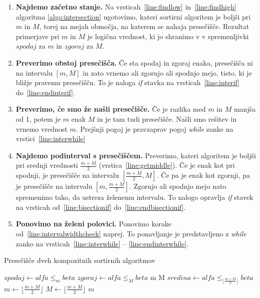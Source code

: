 \documentclass[a4paper,oneside,12pt]{article}
\def\False{\texttt{false}}
\def\True{\texttt{true}}
\begin{document}
\begin{enumerate}
  \item \textbf{Najdemo začetno stanje.} Na vrsticah~\ref{line:findlow} in~\ref{line:findhigh} algoritma
   \ref{algo:intersection} ugotovimo, kateri sortirni
    algoritem je boljši pri $m$ in $M$, torej na mejah območja, na katerem se nahaja
    presečišče. Rezultat primerjave pri $m$ in $M$ je logična vrednost, ki jo shranimo v
    v spremenljivki $spodaj$ za $m$ in $zgoraj$ za $M$.
  \item \textbf{Preverimo obstoj presečišča.} Če sta spodaj in zgoraj enaka, presečišča ni na intervalu $[m, M]$ in zato
    vrnemo ali zgornjo ali spodnjo mejo, tisto, ki je bližje pravemu presečišču. To je
    naloga \emph{if} stavka na vrsticah~\ref{line:interif} do~\ref{line:endinterif}.
  \item \textbf{Preverimo, če smo že našli presečišče.} \label{line:intervalwidthcheck}Če je razlika med $m$ in $M$ manjša od 1, potem je $m$ enak $M$ in je tam tudi
    presečišče. Našli smo rešitev in vrnemo vrednost $m$. Prejšnji pogoj je pravzaprav
    pogoj \emph{while} zanke na vrstici~\ref{line:interwhile}
  \item \textbf{Najdemo podinterval s presečiščem.} Preverimo, kateri algoritem je boljši pri srednji vrednosti $\frac{m+M}{2}$
    (vrstica~\ref{line:getmiddle}).
    Če je enak kot pri spodnji, je presečišče na intervalu $\left[\frac{m+M}{2}, M\right]$. Če pa je
    enak kot zgornji, pa je presečišče na intervalu $\left[m, \frac{m+M}{2}\right]$.
    Zgornjo ali spodnjo mejo nato spremenimo tako, da ustreza želenemu intervalu. To
    nalogo opravlja \emph{if} stavek na vrsticah od~\ref{line:bisectionif} do~\ref{line:endbisectionif}.
  \item \textbf{Ponovimo na želeni polovici.} Ponovimo korake od~\ref{line:intervalwidthcheck} naprej. To ponavljanje je
    predstavljeno z \emph{while} zanko na vrsticah~\ref{line:interwhile} --
   \ref{line:endinterwhile}.
\end{enumerate}

\begin{algorithm}[h!t!]
  \caption{Presečišče dveh kompozitnih sortirnih algoritmov}\label{algo:intersection}
  \begin{algorithmic}[1]
      \State $spodaj \gets alfa \leq_m beta$ \label{line:findlow} 
      \State $zgoraj \gets alfa \leq_M beta$ \label{line:findhigh}
      \If{$spodaj = zgoraj = \False$} \label{line:interif}
        \Return m 
      \ElsIf{$spodaj = zgoraj = \True$}
        \Return M 
      \EndIf \label{line:endinterif}
       \label{line:interwhile}
        \State $sredina \gets alfa \leq_{\lfloor\frac{m+M}{2}\rfloor} beta$
        \label{line:getmiddle}
         \label{line:bisectionif}
          \State $m \gets \lfloor\frac{m+M}{2}\rfloor$
        \Else
          \State $M \gets \lfloor\frac{m+M}{2}\rfloor$
          \EndIf \label{line:endbisectionif}
        \EndWhile \label{line:endinterwhile}
      \State \Return $m$
    \EndFunction
  \end{algorithmic}
\end{algorithm}
\end{document}
